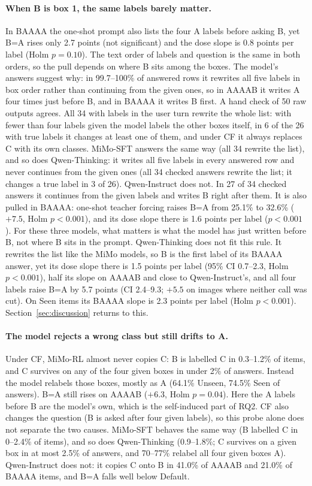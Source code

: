 \paragraph{When B is box 1, the same labels barely matter.} In BAAAA the one-shot prompt also lists
the four A labels before asking B, yet B=A rises only 2.7 points (not significant) and the dose slope
is 0.8 points per label (Holm $p=0.10$). The text order of labels and question is the same in both
orders, so the pull depends on where B sits among the boxes. The model's answers suggest why: in
99.7--100\% of answered rows it rewrites all five labels in box order rather than continuing from the
given ones, so in AAAAB it writes A four times just before B, and in BAAAA it writes B first.
A hand check of 50 raw outputs agrees. All 34 with labels in the user turn rewrite the whole list:
with fewer than four labels given the model labels the other boxes itself, in 6 of the 26 with true
labels it changes at least one of them, and under CF it always replaces C with its own classes.
MiMo-SFT answers the same way (all 34 rewrite the list), and so does Qwen-Thinking: it writes all
five labels in every answered row and never continues from the given ones (all 34 checked answers
rewrite the list; it changes a true label in 3 of 26). Qwen-Instruct does not. In 27 of 34 checked
answers it continues from the given labels and writes B right after them. It is also pulled in
BAAAA: one-shot teacher forcing raises B=A from 25.1\% to 32.6\% ($+7.5$, Holm $p<0.001$), and its
dose slope there is 1.6 points per label ($p<0.001$). For these three models, what matters is what
the model has just written before B, not where B sits in the prompt. Qwen-Thinking does not fit this
rule. It rewrites the list like the MiMo models, so B is the first label of its BAAAA answer, yet its
dose slope there is 1.5 points per label (95\% CI 0.7--2.3, Holm $p<0.001$), half its slope on AAAAB
and close to Qwen-Instruct's, and all four labels raise B=A by 5.7 points (CI 2.4--9.3; $+5.5$ on
images where neither call was cut). On Seen items its BAAAA slope is 2.3 points per label (Holm
$p<0.001$). Section~\ref{sec:discussion} returns to this.

\paragraph{The model rejects a wrong class but still drifts to A.} Under CF, MiMo-RL almost never
copies C: B is labelled C in 0.3--1.2\% of items, and C survives on any of the four given boxes in
under 2\% of answers. Instead the model relabels those boxes, mostly as A (64.1\% Unseen, 74.5\% Seen
of answers). B=A still rises on AAAAB ($+6.3$, Holm $p=0.04$). Here the A labels before B are the
model's own, which is the self-induced part of RQ2. CF also changes the question (B is asked after
four given labels), so this probe alone does not separate the two causes. MiMo-SFT behaves the same
way (B labelled C in 0--2.4\% of items), and so does Qwen-Thinking (0.9--1.8\%; C survives on a given
box in at most 2.5\% of answers, and 70--77\% relabel all four given boxes A). Qwen-Instruct does not: it copies C onto B in 41.0\% of
AAAAB and 21.0\% of BAAAA items, and B=A falls well below Default.

